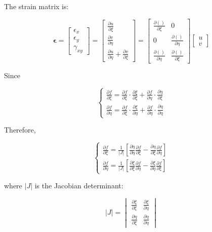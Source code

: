 \documentclass{article}
\begin{document}
The strain matrix is:

\[
\mathbf{\epsilon} = \begin{bmatrix}
\epsilon_x \\
\epsilon_y \\
\gamma_{xy}
\end{bmatrix}
= \begin{bmatrix}
\frac{\partial u}{\partial \xi} \\
\frac{\partial v}{\partial \eta} \\
\frac{\partial u}{\partial \eta} + \frac{\partial v}{\partial \xi}
\end{bmatrix}
= \begin{bmatrix}
\frac{\partial()}{\partial \xi} & 0 \\
0 & \frac{\partial()}{\partial \eta} \\
\frac{\partial()}{\partial \eta} & \frac{\partial()}{\partial \xi}
\end{bmatrix}
\begin{bmatrix}
u \\
v
\end{bmatrix}
\]

Since

\[
\begin{cases}
\frac{\partial f}{\partial \xi} = \frac{\partial f}{\partial \xi} \cdot \frac{\partial \xi}{\partial \xi} + \frac{\partial f}{\partial \eta} \cdot \frac{\partial \eta}{\partial \xi} \\
\frac{\partial f}{\partial \eta} = \frac{\partial f}{\partial \xi} \cdot \frac{\partial \xi}{\partial \eta} + \frac{\partial f}{\partial \eta} \cdot \frac{\partial \eta}{\partial \eta}
\end{cases}
\]

Therefore,

\[
\begin{cases}
\frac{\partial f}{\partial \xi} = \frac{1}{|J|}\left[\frac{\partial \eta}{\partial \eta} \frac{\partial f}{\partial \xi} - \frac{\partial \eta}{\partial \xi} \frac{\partial f}{\partial \eta}\right] \\
\frac{\partial f}{\partial \eta} = \frac{1}{|J|}\left[\frac{\partial \xi}{\partial \xi} \frac{\partial f}{\partial \eta} - \frac{\partial \xi}{\partial \eta} \frac{\partial f}{\partial \xi}\right]
\end{cases}
\]

where \( |J| \) is the Jacobian determinant:

\[
|J| = \begin{vmatrix}
\frac{\partial \xi}{\partial \xi} & \frac{\partial \xi}{\partial \eta} \\
\frac{\partial \eta}{\partial \xi} & \frac{\partial \eta}{\partial \eta}
\end{vmatrix}
\]
\end{document}
